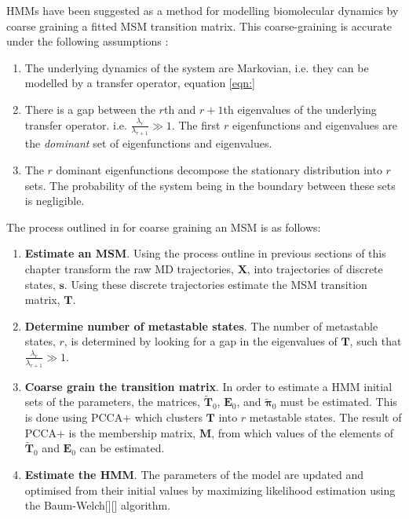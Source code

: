 HMMs have been suggested as a method for modelling biomolecular dynamics by coarse graining a fitted MSM transition matrix\cite{noeProjectedHiddenMarkov2013a}. This coarse-graining is accurate under the following assumptions \cite{noeProjectedHiddenMarkov2013a}: 
\begin{enumerate}
    \item The underlying dynamics of the system are Markovian, i.e. they can be modelled by a transfer operator, equation \ref{eqn:}
    \item There is a gap between the $r$th and $r+1$th  eigenvalues of the underlying transfer operator. i.e. $\frac{\lambda_{r}}{\lambda_{r+1}} \gg 1$. The first $r$ eigenfunctions and eigenvalues are the \emph{dominant} set of eigenfunctions and eigenvalues. \label{assump_two}
    \item The $r$ dominant eigenfunctions decompose the stationary distribution into $r$ sets. The probability of the system being in the boundary between these sets is negligible. \label{assump_three}
\end{enumerate}
The process outlined in \cite{noeProjectedHiddenMarkov2013a} for coarse graining an MSM is as follows: 
\begin{enumerate}
    \item \textbf{Estimate an MSM}. Using the process outline in previous sections of this chapter transform the raw MD trajectories, $\mathbf{X}$, into trajectories of discrete states, $\mathbf{s}$. Using these discrete trajectories estimate the MSM transition matrix, $\mathbf{T}$. 
    \item \textbf{Determine number of metastable states}. The number of metastable states, $r$, is determined by looking for a gap in the eigenvalues of $\mathbf{T}$, such that  $\frac{\lambda_{r}}{\lambda_{r+1}} \gg 1$.
    \item \textbf{Coarse grain the transition matrix}. In order to estimate a HMM initial sets of the parameters, the matrices, $\widetilde{\mathbf{T}}_{0}$,  $\mathbf{E}_{0}$, and $\widetilde{\bm{\pi}}_{0}$ must be estimated. This is done using PCCA+ \cite{deuflhardRobustPerronCluster2005b} which clusters $\mathbf{T}$ into $r$ metastable states. The result of PCCA+ is the membership matrix, $\mathbf{M}$, from which values of the elements of $\widetilde{\mathbf{T}}_{0}$ and $\mathbf{E}_{0}$ can be estimated. 
    \item \textbf{Estimate the HMM}. The parameters of the model are updated and optimised from their initial values by maximizing likelihood estimation using the Baum-Welch[][] algorithm. 
\end{enumerate}

